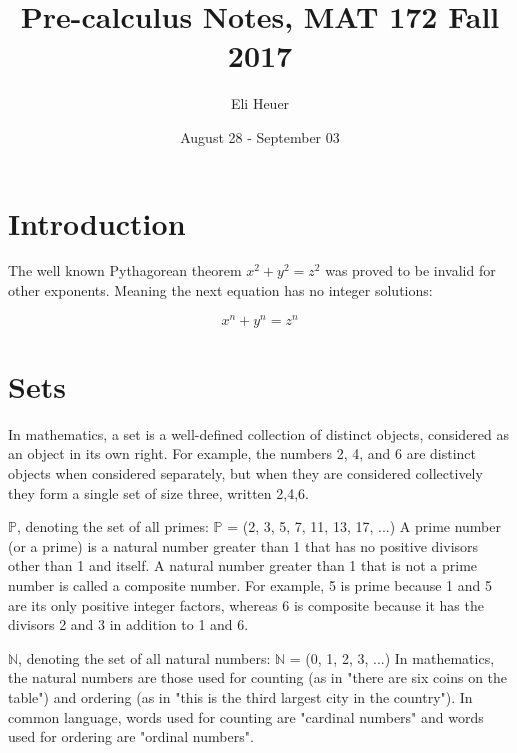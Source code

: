 \documentclass[12pt, letterpaper]{article}
\title{Pre-calculus Notes, MAT 172 Fall 2017}
\author{Eli Heuer}
\date{August 28 - September 03}
\begin{document}
\maketitle

\section{Introduction}

The well known Pythagorean theorem $x^2 + y^2 = z^2$ was proved to be invalid for other
exponents. Meaning the next equation has no integer solutions:

$$x^n+ y^n = z^n$$

\section{Sets}

In mathematics, a set is a well-defined collection of distinct objects, considered
as an object in its own right. For example, the numbers 2, 4, and 6 are distinct objects
when considered separately, but when they are considered collectively they form a single
set of size three, written {2,4,6}.
\newline

\noindent$\mathbb{P}$, denoting the set of all primes: $\mathbb{P}$ = (2, 3, 5, 7, 11, 13, 17, ...)
\newline
\newline
A prime number (or a prime) is a natural number greater than 1 that has no positive
divisors other than 1 and itself. A natural number greater than 1 that is not a prime
number is called a composite number. For example, 5 is prime because 1 and 5 are its
only positive integer factors, whereas 6 is composite because it has the divisors 2 and 3
in addition to 1 and 6.
\newline
\newline

\noindent$\mathbb{N}$, denoting the set of all natural numbers: $\mathbb{N}$ =
(0, 1, 2, 3, ...)
\newline
\newline
In mathematics, the natural numbers are those used for counting (as in "there are six coins
on the table") and ordering (as in "this is the third largest city in the country").
In common language, words used for counting are "cardinal numbers" and words used for
ordering are "ordinal numbers".
\newline
\newline
\end{document}
